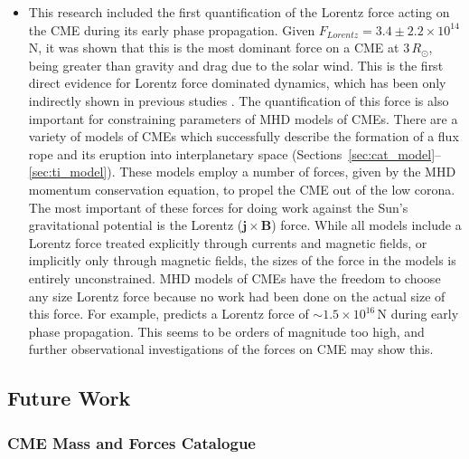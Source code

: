 \begin{itemize}
\item This research included the first quantification of the Lorentz force acting on the CME during its early phase propagation. Given $F_{Lorentz} = 3.4\pm2.2\times10^{14}$\,N, it was shown that this is the most dominant force on a CME at $3\,R_{\odot}$, being greater than gravity and drag due to the solar wind. This is the first direct evidence for Lorentz force dominated dynamics, which has been only indirectly shown in previous studies \citep{bein2011}. The quantification of this force is also important for constraining parameters of MHD models of CMEs. There are a variety of models of CMEs which successfully describe the formation of a flux rope and its eruption into interplanetary space (Sections~\ref{sec:cat_model}--\ref{sec:ti_model}). These models employ a number of forces, given by the MHD momentum conservation equation, to propel the CME out of the low corona. The most important of these forces for doing work against the Sun's gravitational potential is the Lorentz ($\mathbf{j}\times\mathbf{B}$) force. While all models include a Lorentz force treated explicitly through currents and magnetic fields, or implicitly only through magnetic fields, the sizes of the force in the models is entirely unconstrained. MHD models of CMEs have the freedom to choose any size Lorentz force because no work had been done on the actual size of this force. For example, \citep{chen1996} predicts a Lorentz force of $\sim$$1.5\times10^{16}$\,N during early phase propagation. This seems to be orders of magnitude too high, and further observational investigations of the forces on CME may show this.

\end{itemize}

\subsection{Future Work}

\subsubsection{CME Mass and Forces Catalogue}

